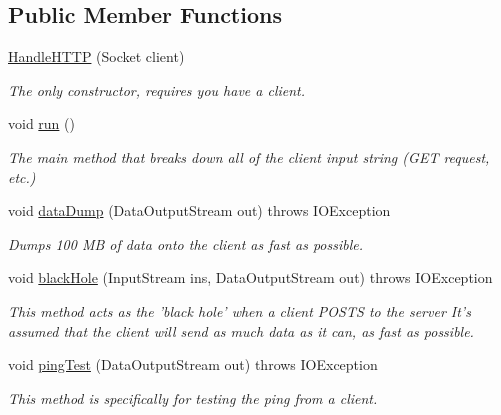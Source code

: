 \subsection*{Public Member Functions}
\begin{DoxyCompactItemize}
\item 
\hyperlink{classcom_1_1server_1_1HandleHTTP_ab3c8c02165c7be1eb515ec8311409499}{Handle\-H\-T\-T\-P} (Socket client)
\begin{DoxyCompactList}\small\item\em The only constructor, requires you have a client. \end{DoxyCompactList}\item 
\hypertarget{classcom_1_1server_1_1HandleHTTP_a016efaa23359d95eabc8fae5996c4a93}{void \hyperlink{classcom_1_1server_1_1HandleHTTP_a016efaa23359d95eabc8fae5996c4a93}{run} ()}\label{classcom_1_1server_1_1HandleHTTP_a016efaa23359d95eabc8fae5996c4a93}

\begin{DoxyCompactList}\small\item\em The main method that breaks down all of the client input string (G\-E\-T request, etc.) \end{DoxyCompactList}\item 
void \hyperlink{classcom_1_1server_1_1HandleHTTP_af21b586545963aa09597b1b23bc4d728}{data\-Dump} (Data\-Output\-Stream out)  throws I\-O\-Exception 
\begin{DoxyCompactList}\small\item\em Dumps 100 M\-B of data onto the client as fast as possible. \end{DoxyCompactList}\item 
void \hyperlink{classcom_1_1server_1_1HandleHTTP_aa8b146dea927cfd479a2866706f586e0}{black\-Hole} (Input\-Stream ins, Data\-Output\-Stream out)  throws I\-O\-Exception
\begin{DoxyCompactList}\small\item\em This method acts as the 'black hole' when a client P\-O\-S\-T\-S to the server It's assumed that the client will send as much data as it can, as fast as possible. \end{DoxyCompactList}\item 
void \hyperlink{classcom_1_1server_1_1HandleHTTP_a0f68531fee6c43a46cb461056bd01bb3}{ping\-Test} (Data\-Output\-Stream out)  throws I\-O\-Exception     
\begin{DoxyCompactList}\small\item\em This method is specifically for testing the ping from a client. \end{DoxyCompactList}\end{DoxyCompactItemize}
